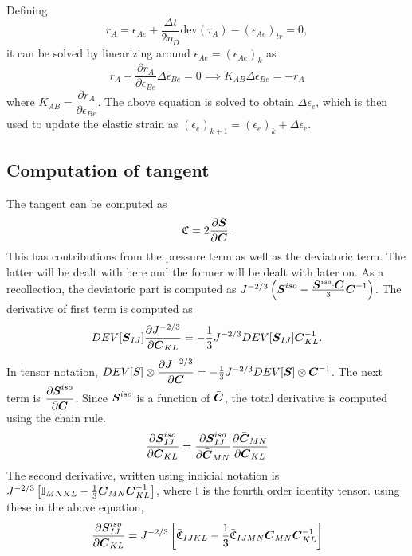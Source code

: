 \documentclass[11pt,twoside,TimesRoman]{article}
\newcommand{\parder}[2]{{\dfrac{\partial #1}{\partial #2}}}
\begin{document}
Defining 
\begin{equation}
	r_A	 = \epsilon_{Ae} + \frac{\Delta t }{2 \eta_D} \text{dev}(\tau_A) - 	(\epsilon_{Ae})_{tr} = 0,
	\label{FV:residualnewtoniter}
\end{equation}
it can be solved by linearizing around $\epsilon_{Ae} = (\epsilon_{Ae})_k$ as
\begin{equation}
r_A + \parder{r_A}{\epsilon_{Be}} \Delta \epsilon_{Be}	 = 0 \implies K_{AB} \Delta \epsilon_{Be}	 = -r_A
\end{equation}
where $K_{AB} = \parder{r_A}{\epsilon_{Be}}$. The above equation is solved to obtain $\Delta \epsilon_{e}$, which is then used to update the elastic strain as $(\epsilon_e)_{k+1} = (\epsilon_e)_{k} + \Delta \epsilon_{e}$.

\subsection{Computation of tangent}
The tangent can be computed as 
\begin{equation}
	\mathfrak{C} = 2 \parder{\bfS}{\bfC}.
\end{equation}
This has contributions from the pressure term as well as the deviatoric term. The latter will be dealt with here and the former will be dealt with later on. As a recollection, the deviatoric part is computed as $J^{-2/3} \left(\mbox{\boldmath $S$}^{iso}-\frac{\mbox{\boldmath $S$}^{iso}:\mbox{\boldmath $C$}}{3}\mbox{\boldmath $C$}^{-1} \right)$. The derivative of first term is computed as 
\begin{equation}
DEV[\bfS_{IJ}] \parder{J^{-2/3}}{\bfC_{KL}}= -\frac{1}{3} J^{-2/3} DEV[\bfS_{IJ}] {\bfC^{-1}_{KL}}.
\end{equation}
In tensor notation, $DEV[S] \otimes \parder{J^{-2/3}}{\bfC} = -\frac{1}{3} J^{-2/3} DEV[\bfS]  \otimes {\bfC^{-1}}$. The next term is $\parder{\bfS^{iso}}{\bfC}$. Since $\mbox{\boldmath $S$}^{iso}$ is a function of $\bar{\mbox{\boldmath $C$}}$, the total derivative is computed using the chain rule.
\begin{equation}
 \parder{\bfS^{iso}_{IJ}}{\bfC_{KL}} =  \parder{\bfS^{iso}_{IJ}}{\bar{\bfC}_{MN}} \parder{\bar{\bfC}_{MN}}{{\bfC}_{KL}}
\end{equation}
The second derivative, written using indicial notation is $J^{-2/3}\left[\mathbb{I}_{MNKL}- \frac{1}{3} \mbox{\boldmath $C$}_{MN} \mbox{\boldmath $C$}^{-1}_{KL}   \right]$, where $\mathbb{I}$ is the fourth order identity tensor. using these in the above equation,
\begin{equation}
\parder{\bfS^{iso}_{IJ}}{\bfC_{KL}} =  J^{-2/3}\left[\bar{\mathfrak{C}}_{IJKL}- \frac{1}{3} \bar{\mathfrak{C}}_{IJMN} \bfC_{MN} \bfC^{-1}_{KL} \right]  
\end{equation}
\end{document}
